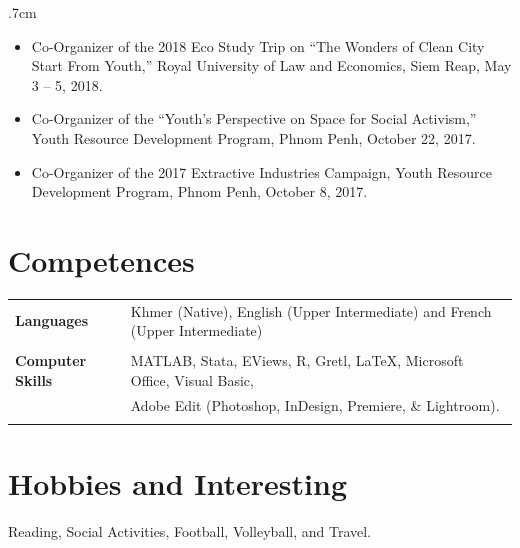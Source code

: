 \documentclass[10pt,a4paper]{article}
\begin{document}
\begin{adjustwidth}{.7cm}{}
\begin{itemize}[label={},itemindent=-2em,leftmargin=2em]
				\item Co-Organizer of the 2018 Eco Study Trip on “The Wonders of Clean City Start From Youth,'' Royal University of Law and Economics, Siem Reap, May 3 -- 5, 2018.
				
				\item Co-Organizer of the “Youth's Perspective on Space for Social Activism,” Youth Resource Development Program, Phnom Penh, October 22, 2017.
				
				\item Co-Organizer of the 2017 Extractive Industries Campaign, Youth Resource Development Program, Phnom Penh, October 8, 2017.				
			\end{itemize}
		\end{adjustwidth}
		\vspace{-1em}
\section*{Competences}
		\vspace{0em}
		\noindent \begin{tabular}{@{} l l}

			\hspace{2em}	\textbf{Languages} & Khmer (Native), English (Upper Intermediate) and French (Upper Intermediate)\\ 
			& \\
									
			\hspace{2em}	\textbf{Computer Skills} & MATLAB, Stata, EViews, R, Gretl, \LaTeX, Microsoft Office, Visual Basic, \\
			& Adobe Edit (Photoshop, InDesign, Premiere, \& Lightroom). \\ 
			& \\

		\end{tabular}
		\vspace{-1.5em}
\section*{Hobbies and Interesting}
	\vspace{0em}
	
		Reading, Social Activities, Football, Volleyball, and Travel.
								
	\vspace{-1em}
\end{document}
